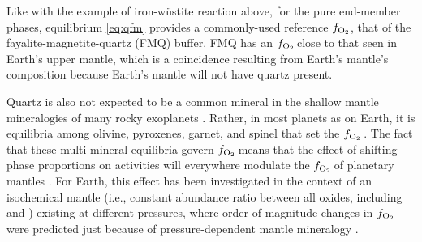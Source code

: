 \documentclass[fleqn,usenatbib,twocolumn]{mnras}
\newcommand{\fo}{$f_{\ce{O2}}$}
\newcommand{\todo}[1]{\textit{\textcolor{violet}{{#1}}}}
\begin{document}
Like with the example of iron-w\"ustite reaction above, for the pure end-member phases, equilibrium \eqref{eq:qfm} provides a commonly-used reference \fo, that of the fayalite-magnetite-quartz (FMQ) buffer. FMQ has an \fo\,close to that seen in Earth's upper mantle, which is a coincidence resulting from Earth's mantle's composition because Earth's mantle will not have quartz present.


Quartz is also not expected to be a common mineral in the shallow mantle mineralogies of many rocky exoplanets \citep{guimond_mantle_2023, spaargaren_plausible_2022}. Rather, in most planets as on Earth, it is equilibria among olivine, pyroxenes, garnet, and spinel that set the \fo\,\citep[see][for a detailed review of these effects]{stolper_effects_2020}. The fact that these multi-mineral equilibria govern \fo\,means that the effect of shifting phase proportions on  activities will everywhere modulate the \fo\,of planetary mantles \citep[e.g.,][]{frost_introduction_1991, oneill_ferric_1993, ballhaus_is_1995, rohrbach_metal_2007, frost_redox_2008, jennings_simple_2015, stolper_effects_2020}. For Earth, this effect has been investigated in the context of an isochemical mantle (i.e., constant abundance ratio between all oxides, including  and ) existing at different pressures, where order-of-magnitude changes in \fo\,were predicted just because of pressure-dependent mantle mineralogy \citep{stolper_effects_2020}. 
\end{document}
